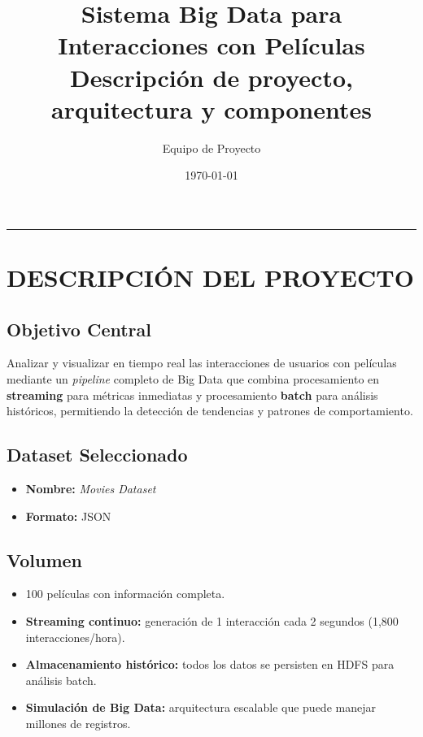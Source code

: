 \documentclass[11pt,a4paper]{article}
\title{\textbf{Sistema Big Data para Interacciones con Películas}\\[2mm]
\large Descripción de proyecto, arquitectura y componentes}
\author{Equipo de Proyecto}
\date{\today}
\begin{document}
\maketitle
\vspace{-0.5em}
\hrule
\vspace{1.0em}

\section{DESCRIPCIÓN DEL PROYECTO}

\subsection*{Objetivo Central}
Analizar y visualizar en tiempo real las interacciones de usuarios con películas mediante un \textit{pipeline} completo de Big Data que combina procesamiento en \textbf{streaming} para métricas inmediatas y procesamiento \textbf{batch} para análisis históricos, permitiendo la detección de tendencias y patrones de comportamiento.

\subsection*{Dataset Seleccionado}
\begin{itemize}
  \item \textbf{Nombre:} \textit{Movies Dataset}
  \item \textbf{Formato:} JSON
\end{itemize}

\subsection*{Volumen}
\begin{itemize}
  \item 100 películas con información completa.
  \item \textbf{Streaming continuo:} generación de 1 interacción cada 2 segundos (1{,}800 interacciones/hora).
  \item \textbf{Almacenamiento histórico:} todos los datos se persisten en HDFS para análisis batch.
  \item \textbf{Simulación de Big Data:} arquitectura escalable que puede manejar millones de registros.
\end{itemize}
\end{document}

